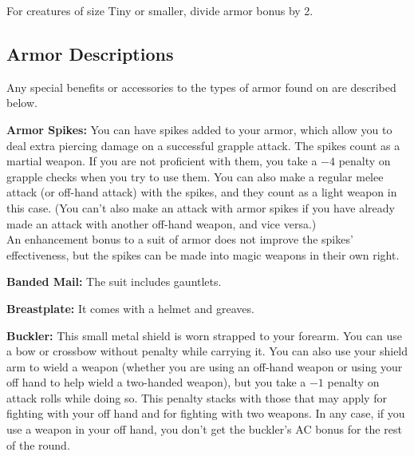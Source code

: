 For creatures of size Tiny or smaller, divide armor bonus by 2.


\subsection{Armor Descriptions}
Any special benefits or accessories to the types of armor found on  are described below.

\textbf{Armor Spikes:} You can have spikes added to your armor, which allow you to deal extra piercing damage on a successful grapple attack. The spikes count as a martial weapon. If you are not proficient with them, you take a $-4$ penalty on grapple checks when you try to use them. You can also make a regular melee attack (or off-hand attack) with the spikes, and they count as a light weapon in this case. (You can't also make an attack with armor spikes if you have already made an attack with another off-hand weapon, and vice versa.)\\An enhancement bonus to a suit of armor does not improve the spikes' effectiveness, but the spikes can be made into magic weapons in their own right.

\textbf{Banded Mail:} The suit includes gauntlets.

\textbf{Breastplate:} It comes with a helmet and greaves.

\textbf{Buckler:} This small metal shield is worn strapped to your forearm. You can use a bow or crossbow without penalty while carrying it. You can also use your shield arm to wield a weapon (whether you are using an off-hand weapon or using your off hand to help wield a two-handed weapon), but you take a $-1$ penalty on attack rolls while doing so. This penalty stacks with those that may apply for fighting with your off hand and for fighting with two weapons. In any case, if you use a weapon in your off hand, you don't get the buckler's AC bonus for the rest of the round.

